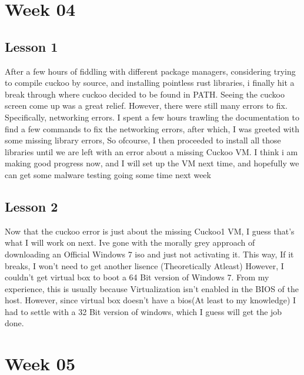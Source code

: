 \documentclass{article}
\begin{document}
\section{Week 04}
\subsection{Lesson 1}
After a few hours of fiddling with different package managers, considering trying to compile cuckoo by source, and installing pointless rust libraries, i finally hit a break through where cuckoo decided to be found in PATH. Seeing the cuckoo screen come up was a great relief. However, there were still many errors to fix. Specifically, networking errors. I spent a few hours trawling the documentation to find a few commands to fix the networking errors, after which, I was greeted with some missing library errors, So ofcourse, I then proceeded to install all those libraries until we are left with an error about a missing Cuckoo VM. I think i am making good progress now, and I will set up the VM next time, and hopefully we can get some malware testing going some time next week
\subsection{Lesson 2}
Now that the cuckoo error is just about the missing Cuckoo1 VM, I guess that's what I will work on next. Ive gone with the morally grey approach of downloading an Official Windows 7 iso and just not activating it. This way, If it breaks, I won't need to get another lisence (Theoretically Atleast) However, I couldn't get virtual box to boot a 64 Bit version of Windows 7. From my experience, this is usually because Virtualization isn't enabled in the BIOS of the host. However, since virtual box doesn't have a bios(At least to my knowledge) I had to settle with a 32 Bit version of windows, which I guess will get the job done. 

\section{Week 05}
\end{document}
